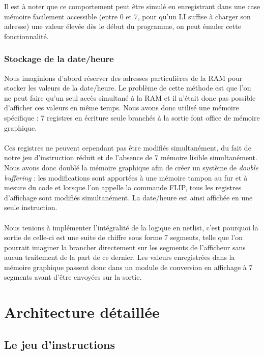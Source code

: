 \documentclass{article}
\begin{document}
Il est à noter que ce comportement peut être simulé en enregistrant dans une case
mémoire facilement accessible (entre 0 et 7, pour qu'un LI suffise à charger son
adresse) une valeur élevée dès le début du programme, on peut émuler cette fonctionnalité.

\subsubsection{Stockage de la date/heure}
Nous imaginions d'abord réserver des adresses particulières de la RAM pour
stocker les valeurs de la date/heure. Le problème de cette méthode est que l'on
ne peut faire qu'un seul accès simultané à la RAM et il n'était donc pas possible
d'afficher ces valeurs en même temps. Nous avons donc utilisé une mémoire
spécifique : 7 registres en écriture seule branchés à la sortie font office
de mémoire graphique.

\paragraph{}
Ces registres ne peuvent cependant pas être modifiés simultanément, du fait de
notre jeu d'instruction réduit et de l'absence de 7 mémoire lisible simultanément.
Nous avons donc doublé la mémoire graphique afin de créer un système de \emph{double
buffering} : les modifications sont apportées à une mémoire tampon au fur et à mesure
du code et lorsque l'on appelle la commande FLIP, tous les registres d'affichage
sont modifiés simultanément. La date/heure est ainsi affichée en une seule instruction.

\paragraph{}
Nous tenions à implémenter l'intégralité de la logique en netlist, c'est pourquoi
la sortie de celle-ci est une suite de chiffre sous forme 7 segments, telle que l'on
pourrait imaginer la brancher directement sur les segments de l'afficheur sans
aucun traitement de la part de ce dernier. Les valeurs enregistrées dans la mémoire
graphique passent donc dans un module de conversion en affichage à 7 segments avant
d'être envoyées sur la sortie.


\section{Architecture détaillée}

\subsection{Le jeu d'instructions}
\end{document}
